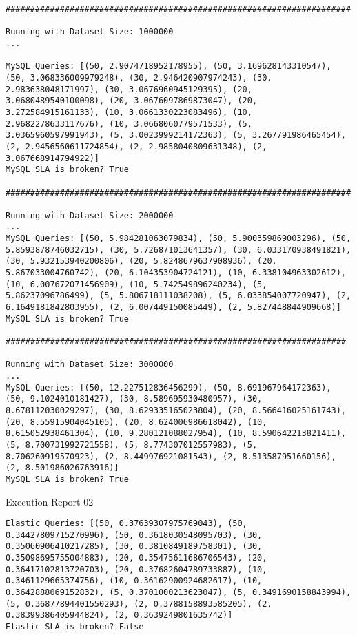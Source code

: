 \begin{lstlisting}
######################################################################

Running with Dataset Size: 1000000
...

MySQL Queries: [(50, 2.9074718952178955), (50, 3.169628143310547), (50, 3.068336009979248), (30, 2.946420907974243), (30, 2.983638048171997), (30, 3.0676960945129395), (20, 3.0680489540100098), (20, 3.0676097869873047), (20, 3.272584915161133), (10, 3.0661330223083496), (10, 2.9682278633117676), (10, 3.0668060779571533), (5, 3.0365960597991943), (5, 3.0023999214172363), (5, 3.267791986465454), (2, 2.9456560611724854), (2, 2.9858040809631348), (2, 3.067668914794922)]
MySQL SLA is broken? True

######################################################################

Running with Dataset Size: 2000000
...
MySQL Queries: [(50, 5.984281063079834), (50, 5.900359869003296), (50, 5.8593878746032715), (30, 5.726871013641357), (30, 6.033170938491821), (30, 5.932153940200806), (20, 5.8248679637908936), (20, 5.867033004760742), (20, 6.104353904724121), (10, 6.338104963302612), (10, 6.007672071456909), (10, 5.742549896240234), (5, 5.86237096786499), (5, 5.806718111038208), (5, 6.033854007720947), (2, 6.1649181842803955), (2, 6.007449150085449), (2, 5.827448844909668)]
MySQL SLA is broken? True

#####################################################################

Running with Dataset Size: 3000000
...
MySQL Queries: [(50, 12.227512836456299), (50, 8.691967964172363), (50, 9.1024010181427), (30, 8.589695930480957), (30, 8.678112030029297), (30, 8.629335165023804), (20, 8.566416025161743), (20, 8.55915904045105), (20, 8.624006986618042), (10, 8.615052938461304), (10, 9.280121088027954), (10, 8.590642213821411), (5, 8.700731992721558), (5, 8.774307012557983), (5, 8.706260919570923), (2, 8.449976921081543), (2, 8.513587951660156), (2, 8.501986026763916)]
MySQL SLA is broken? True

\end{lstlisting}


Execution Report 02 
\begin{lstlisting}
Elastic Queries: [(50, 0.37639307975769043), (50, 0.34427809715270996), (50, 0.3618030548095703), (30, 0.35060906410217285), (30, 0.3810849189758301), (30, 0.35098695755004883), (20, 0.35475611686706543), (20, 0.36417102813720703), (20, 0.37682604789733887), (10, 0.3461129665374756), (10, 0.36162900924682617), (10, 0.3642888069152832), (5, 0.3701000213623047), (5, 0.3491690158843994), (5, 0.36877894401550293), (2, 0.3788158893585205), (2, 0.38399386405944824), (2, 0.3639249801635742)]
Elastic SLA is broken? False

\end{lstlisting}